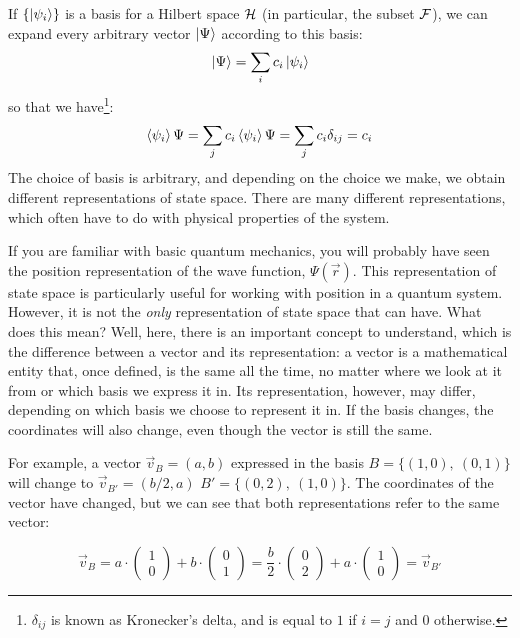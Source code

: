 If $\{\ket{\psi_i}\}$ is a basis for a Hilbert space $\mathcal{H}$ (in particular, the subset $\mathcal{F}$), we can expand every arbitrary vector $\ket{\Psi}$ according to this basis:
\begin{equation}
    \ket{\Psi} = \sum_i c_i \ket{\psi_i}
\end{equation}
so that we have\footnote{$\delta_{ij}$ is known as Kronecker's delta, and is equal to $1$ if $i=j$ and $0$ otherwise.}:
\begin{equation}
    \braket{\psi_i}{\Psi} = \sum_j c_i \braket{\psi_i}{\Psi} = \sum_j c_i\delta_{ij} = c_i
\end{equation}
The choice of basis is arbitrary, and depending on the choice we make, we obtain different representations of state space. There are many different representations, which often have to do with physical properties of the system. 

If you are familiar with basic quantum mechanics, you will probably have seen the position representation of the wave function, $\Psi\left(\vec{r}\right)$. This representation of state space is particularly useful for working with position in a quantum system. However, it is not the \textit{only} representation of state space that can have. What does this mean? Well, here, there is an important concept to understand, which is the difference between a vector and its representation: a vector is a mathematical entity that, once defined, is the same all the time, no matter where we look at it from or which basis we express it in. Its representation, however, may differ, depending on which basis we choose to represent it in. If the basis changes, the coordinates will also change, even though the vector is still the same.

For example, a vector $\vec{v}_B = (a, b)$ expressed in the basis $B=\{(1, 0),\ (0, 1)\}$ will change to $\vec{v}_{B'} = (b/2, a)$ $B'=\{(0, 2),\ (1, 0)\}$. The coordinates of the vector have changed, but we can see that both representations refer to the same vector:

\begin{equation}
    \vec{v}_B = a\cdot \begin{pmatrix}
        1 \\ 0
    \end{pmatrix} + b \cdot \begin{pmatrix}
        0 \\ 1
    \end{pmatrix} = 
    \frac{b}{2}\cdot \begin{pmatrix}
        0 \\ 2
    \end{pmatrix} + a \cdot \begin{pmatrix}
        1 \\ 0
    \end{pmatrix} = \vec{v}_{B'}
\end{equation}

